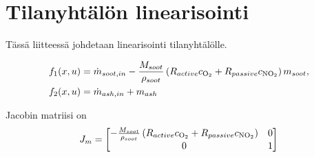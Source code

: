 
\chapter{Tilanyhtälön linearisointi}%
\label{ch:tila_linearisointi}

Tässä liitteessä johdetaan linearisointi tilanyhtälölle.

\begin{align}
    f_1(x,u) &=
    \dot{m}_{soot, in} - \frac{M_{soot}}{\rho_{soot}} 
    \left(R_{active} c_{\ce{O2}} + R_{passive} c_{\ce{NO2}} \right) m_{soot},
    \\
    f_2(x, u) &= \dot{m}_{ash, in} + m_{ash}
\end{align}

Jacobin matriisi on
\begin{align}
    J_m =
    \bm{
    - \frac{M_{soot}}{\rho_{soot}} 
    \left(R_{active} c_{\ce{O2}} + R_{passive} c_{\ce{NO2}} \right)
    &
    0
    \\
    0
    &
    1
    }
\end{align}